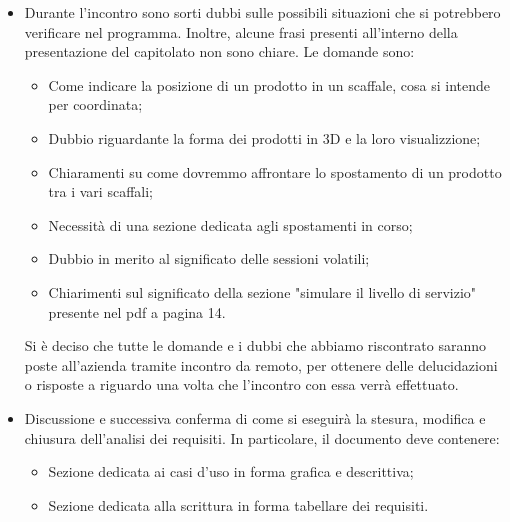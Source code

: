 \begin{itemize}
\begin{itemize}
            \end{itemize}
        \item Durante l'incontro sono sorti dubbi sulle possibili situazioni che si potrebbero verificare nel programma. Inoltre, alcune frasi presenti all'interno della presentazione del capitolato non sono chiare. Le domande sono:
            \begin{itemize}
                \item Come indicare la posizione di un prodotto in un scaffale, cosa si intende per coordinata;
                \item Dubbio riguardante la forma dei prodotti in 3D e la loro visualizzione;
                \item Chiaramenti su come dovremmo affrontare lo spostamento di un prodotto tra i vari scaffali;
                \item Necessità di una sezione dedicata agli spostamenti in corso;
                \item Dubbio in merito al significato delle sessioni volatili;
                \item Chiarimenti sul significato della sezione "simulare il livello di servizio" presente nel pdf a pagina 14.
            \end{itemize}
        Si è deciso che tutte le domande e i dubbi che abbiamo riscontrato saranno poste all'azienda tramite incontro da remoto, per ottenere delle delucidazioni o risposte a riguardo una volta che l'incontro con essa verrà effettuato.\\
        \item Discussione e successiva conferma di come si eseguirà la stesura, modifica e chiusura dell'analisi dei requisiti. In particolare, il documento deve contenere:
        \begin{itemize}
            \item Sezione dedicata ai casi d'uso in forma grafica e descrittiva;
            \item Sezione dedicata alla scrittura in forma tabellare dei requisiti.
        \end{itemize}
    \end{itemize}